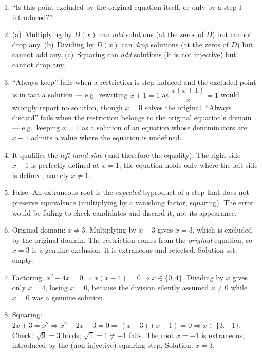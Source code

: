 \documentclass{essay}
\begin{document}
\begin{enumerate}
  \item ``Is this point excluded by the original equation itself, or only by a step I
    introduced?''

  \item (a)~Multiplying by $D(x)$ can \emph{add} solutions (at the zeros of $D$) but cannot
    drop any. (b)~Dividing by $D(x)$ can \emph{drop} solutions (at the zeros of $D$) but cannot
    add any. (c)~Squaring can \emph{add} solutions (it is not injective) but cannot drop any.

  \item ``Always keep'' fails when a restriction is step-induced and the excluded point is in
    fact a solution --- e.g.\ rewriting $x+1=1$ as $\dfrac{x(x+1)}{x}=1$ would wrongly report no
    solution, though $x=0$ solves the original. ``Always discard'' fails when the restriction
    belongs to the original equation's domain --- e.g.\ keeping $x=1$ as a solution of an
    equation whose denominators are $x-1$ admits a value where the equation is undefined.

  \item It qualifies the \emph{left-hand side} (and therefore the equality). The right side
    $x+1$ is perfectly defined at $x=1$; the equation holds only where the left side is defined,
    namely $x \neq 1$.

  \item False. An extraneous root is the \emph{expected} byproduct of a step that does not
    preserve equivalence (multiplying by a vanishing factor, squaring). The error would be
    failing to check candidates and discard it, not its appearance.

  \item Original domain: $x \neq 3$. Multiplying by $x-3$ gives $x = 3$, which is excluded by
    the original domain. The restriction comes from the \emph{original} equation, so $x=3$ is a
    genuine exclusion: it is extraneous and rejected. Solution set: empty.

  \item Factoring: $x^2 - 4x = 0 \Rightarrow x(x-4) = 0 \Rightarrow x \in \{0, 4\}$. Dividing
    by $x$ gives only $x = 4$, losing $x = 0$, because the division silently assumed $x \neq 0$
    while $x=0$ was a genuine solution.

  \item Squaring: $2x+3 = x^2 \Rightarrow x^2 - 2x - 3 = 0 \Rightarrow (x-3)(x+1) = 0
    \Rightarrow x \in \{3, -1\}$. Check: $\sqrt{9} = 3$ holds; $\sqrt{1} = 1 \neq -1$ fails. The
    root $x = -1$ is extraneous, introduced by the (non-injective) squaring step. Solution:
    $x = 3$.


\end{enumerate}
\end{document}
